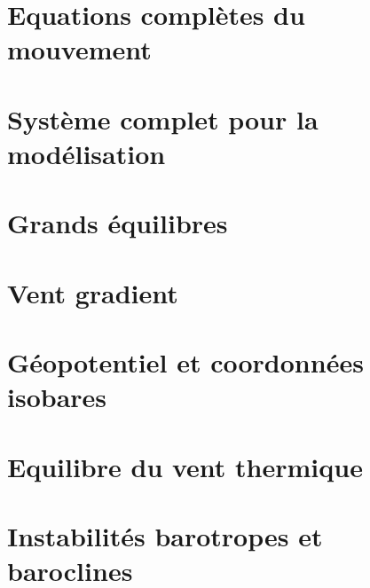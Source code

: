 \documentclass[a4paper,DIV16,10pt]{scrartcl}
\begin{document}
\section{Equations complètes du mouvement}


\section{Système complet pour la modélisation}


%


%	

%	


\newpage
\section{Grands équilibres}


\newpage
\section{Vent gradient}


\newpage
\section{Géopotentiel et coordonnées isobares}


\newpage
\section{Equilibre du vent thermique}


%

\newpage
\section{Instabilités barotropes et baroclines}

\end{document}
